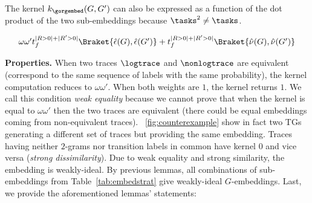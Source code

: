 %		
%
%
The kernel $k_{\gorgembed}(G,G')$ can also be expressed as a function of the dot product of the two sub-embeddings because $\tasks^2\neq\tasks$.

\vspace*{-3mm}
\begin{equation}\label{eq:corollLem1}
\begin{array}{l}\omega\omega't_f^{|R>0|+|R'>0|}\Braket{\hat{\epsilon}(G), \hat{\epsilon}(G')}+t_f^{|R>0|+|R'>0|}\Braket{\hat{\nu}(G), \hat{\nu}(G')}
\end{array}  
\end{equation}

\noindent
\textbf{Properties.}\label{subsub:prop}
When two traces $\logtrace$ and ${\nonlogtrace}$ are equivalent (correspond to the same sequence of labels with the 
same probability), the kernel computation reduces to $\omega\omega'$. When both weights are $1$, the kernel returns $1$. 
We call this condition \textit{weak equality} because we cannot prove that when the kernel is equal to $\omega\omega'$ then the two traces are equivalent (there could be equal embeddings coming from non-equivalent traces). \figurename~\ref{fig:counterexample} show in fact two TGs generating a different set of traces but providing the same embedding.
%
Traces having neither $2$-grams nor transition labels in common have kernel $0$ and vice versa (\textit{strong dissimilarity}).
%
Due to weak equality and strong similarity, the embedding is weakly-ideal. {By previous lemmas, all combinations of sub-embeddings from Table~\ref{tab:embedstrat} give weakly-ideal $G$-embeddings.} 
%
Last, we provide the aforementioned lemmas' statements:


